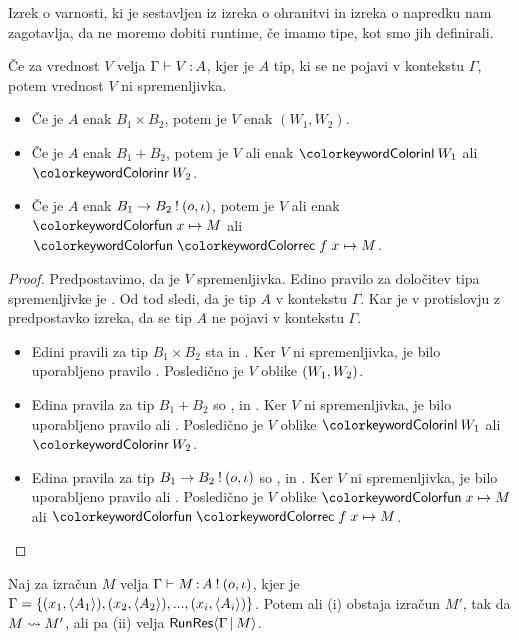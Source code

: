 Izrek o varnosti, ki je sestavljen iz izreka o ohranitvi in izreka o napredku nam zagotavlja, da ne moremo dobiti runtime, če imamo tipe, kot smo jih definirali.

\begin{lema}\label{lem:ni-spremenljivka}
	Če za vrednost $V$ velja $\Gamma \vdash V \mathinner{:} A$, kjer je $A$ tip, ki se ne pojavi v kontekstu $\Gamma$, potem vrednost $V$ ni spremenljivka.
	\begin{itemize}
		\item Če je $A$ enak $B_1 \times B_2$, potem je $V$ enak $(W_1,W_2)$.
		\item Če je $A$ enak $B_1 + B_2$, potem je $V$ ali enak $\tminl{W_1}$ ali $\tminr{W_2}$.
		\item Če je $A$ enak $B_1 \to B_2 \mathbin{!} (o, \iota)$, potem je $V$ ali enak $\tmfunano{x}{M}$ ali $\tmfunrecano{f}{x}{M}$.
	\end{itemize}
\end{lema}

\begin{proof}
	Predpostavimo, da je $V$ spremenljivka. Edino pravilo za določitev tipa spremenljivke je . Od tod sledi, da je tip $A$ v kontekstu $\Gamma$. Kar je v protislovju z predpostavko izreka, da se tip $A$ ne pojavi v kontekstu $\Gamma$.
	\begin{itemize}
		\item Edini pravili za tip $B_1 \times B_2$ sta  in . Ker $V$ ni spremenljivka, je bilo uporabljeno pravilo . Posledično je $V$ oblike $( W_1 , W_2 )$.
		
		\item Edina pravila za tip $B_1 + B_2$ so ,  in . Ker $V$ ni spremenljivka, je bilo uporabljeno pravilo  ali . Posledično je $V$ oblike $\tminl{W_1}$ ali $\tminr{W_2}$.
		
		\item Edina pravila za tip $B_1 \to B_2 \mathbin{!} (o, \iota)$ so ,  in . Ker $V$ ni spremenljivka, je bilo uporabljeno pravilo  ali . Posledično je $V$ oblike $\tmfunano{x}{M}$ ali $\tmfunrecano{f}{x}{M}$.
	\end{itemize}
\end{proof}


\begin{trditev}[o napredku]\label{trd:gamma-napredek}
	Naj za izračun $M$ velja $\Gamma \vdash M \mathinner{:} A \mathbin{!} (o, \iota)$, kjer je $\Gamma = \{(x_1,\langle A_1 \rangle),(x_2,\langle A_2 \rangle),...,(x_i,\langle A_i \rangle)\}$. Potem ali (i) obstaja izračun $M'$, tak da $M \leadsto M'$, ali pa (ii) velja $\mathsf{RunRes}\langle\Gamma \,\vert\, M\rangle$.
\end{trditev}

